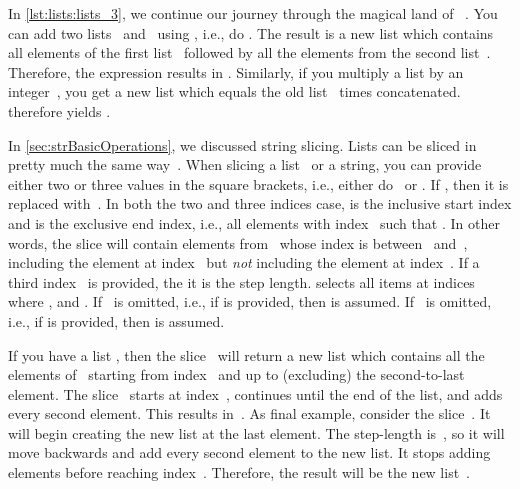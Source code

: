 In \cref{lst:lists:lists_3}, we continue our journey through the magical land of \python\ .
You can add two lists~ and~ using \pythonilIdx{+}, i.e., do .
The result is a new list which contains all elements of the first list~ followed by all the elements from the second list~.
Therefore, the expression \pythonil{[1, 2, 3, 4] + [5, 6, 7]} results in \pythonil{[1, 2, 3, 4, 5, 6, 7]}.
Similarly, if you multiply a list by an integer~, you get a new list which equals the old list ~times concatenated.
 therefore yields \pythonil{[5, 6, 7, 5, 6, 7, 5, 6, 7]}.

In \cref{sec:strBasicOperations}, we discussed string slicing.
Lists can be sliced in pretty much the same way~\cite{PSF2024S}.
When slicing a list~ or a string, you can provide either two or three values in the square brackets\pythonIdx{[\idxdots]}\pythonIdx{[i:j:k]}, i.e., either do~\pythonIdx{[i:j]} or .
If , then it is replaced with~.
In both the two and three indices case,  is the inclusive start index and  is the exclusive end index, i.e., all elements with index~ such that .
In other words, the slice will contain elements from~ whose index is between~ and~, including the element at index~ but \emph{not} including the element at index~.
If a third index~ is provided, the it is the step length.
 selects all items at indices~ where ,  and .
If~ is omitted, i.e., if  is provided, then  is assumed.
If~ is omitted, i.e., if  is provided, then  is assumed.

If you have a list , then the slice~ will return a new list which contains all the elements of~ starting from index~ and up to (excluding) the second-to-last element.
The slice~ starts at index~, continues until the end of the list, and adds every second element.
This results in~\pythonil{[6, 5, 7, 6]}.
As final example, consider the slice~.
It will begin creating the new list at the last element.
The step-length is~, so it will move backwards and add every second element to the new list.
It stops adding elements before reaching index~.
Therefore, the result will be the new list~.

